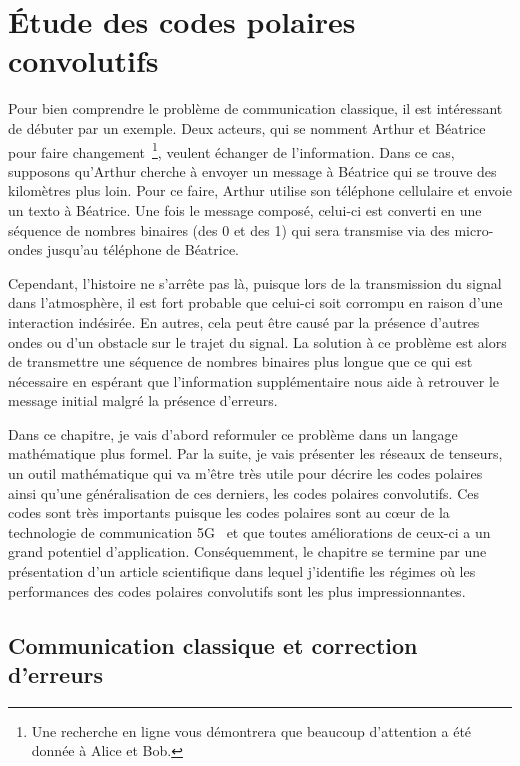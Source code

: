 \begin{comment}
\end{comment}

\chapter{Étude des codes polaires convolutifs}
Pour bien comprendre le problème de communication classique,
il est intéressant de débuter par un exemple.
Deux acteurs, 
qui se nomment Arthur et Béatrice pour faire changement~\footnote{
  Une recherche en ligne vous démontrera que beaucoup d'attention a été donnée 
  à Alice et Bob. 
},
veulent échanger de l'information.
Dans ce cas,
supposons qu'Arthur cherche à envoyer un message à Béatrice qui se trouve
des kilomètres plus loin.
Pour ce faire,
Arthur utilise son téléphone cellulaire et envoie un texto à Béatrice.
Une fois le message composé,
celui-ci est converti en une séquence de nombres binaires (des 0 et des 1)
qui sera transmise via des micro-ondes jusqu'au téléphone de Béatrice.

Cependant, 
l'histoire ne s'arrête pas là,
puisque lors de la transmission du signal dans l'atmosphère,
il est fort probable que celui-ci soit corrompu en raison d'une interaction indésirée.
En autres, 
cela peut être causé par la présence d'autres ondes ou d'un obstacle sur le trajet du signal.
La solution à ce problème est alors de transmettre une séquence de nombres binaires
plus longue que ce qui est nécessaire en espérant que l'information supplémentaire
nous aide à retrouver le message initial malgré la présence d'erreurs.

Dans ce chapitre,
je vais d'abord reformuler ce problème dans un langage mathématique plus formel.  
Par la suite, 
je vais présenter les réseaux de tenseurs,
un outil mathématique qui va m'être très utile pour décrire les codes polaires 
ainsi qu'une généralisation de ces derniers, les codes polaires convolutifs.
Ces codes sont très importants puisque les codes polaires sont au cœur 
de la technologie de communication 5G~\cite{bioglio_design_2021}
et que toutes améliorations de ceux-ci a un grand potentiel d'application.
Conséquemment,
le chapitre se termine par une présentation d'un article scientifique dans lequel
j'identifie les régimes où les performances des codes polaires convolutifs sont les plus impressionnantes.

\section{Communication classique et correction d'erreurs}

